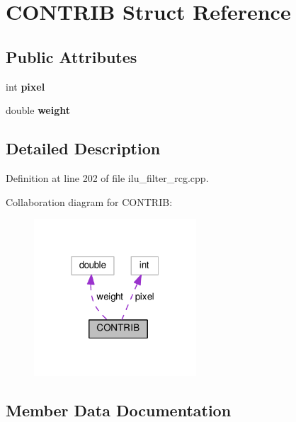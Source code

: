 \hypertarget{structCONTRIB}{}\section{C\+O\+N\+T\+R\+IB Struct Reference}
\label{structCONTRIB}
\subsection*{Public Attributes}
\begin{DoxyCompactItemize}
\item 
\mbox{\label{structCONTRIB_ad0ca1763c6f64f297ac6f0af2882475c}} 
int {\bfseries pixel}
\item 
\mbox{\label{structCONTRIB_a60106e6aef9c3593fac57bde6e9e0db3}} 
double {\bfseries weight}
\end{DoxyCompactItemize}


\subsection{Detailed Description}


Definition at line 202 of file ilu\+\_\+filter\+\_\+rcg.\+cpp.



Collaboration diagram for C\+O\+N\+T\+R\+IB\+:
\nopagebreak
\begin{figure}[H]
\begin{center}
\leavevmode
\includegraphics[width=172pt]{d3/d45/structCONTRIB__coll__graph}
\end{center}
\end{figure}


\subsection{Member Data Documentation}
\mbox{\label{structCONTRIB_ad0ca1763c6f64f297ac6f0af2882475c}} 
